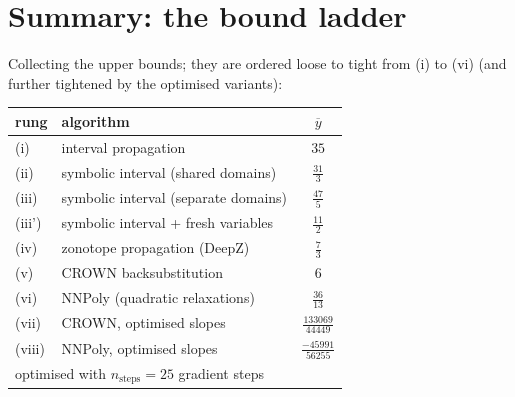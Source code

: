 \documentclass[11pt]{article}
\begin{document}
\section{Summary: the bound ladder}
Collecting the upper bounds; they are ordered loose to tight from (i) to (vi)
(and further tightened by the optimised variants):
\begin{table}[ht]\centering
\begin{tabular}{llc}\toprule
rung & algorithm & $\overline{y}$ \\
\midrule
(i) & interval propagation & $35$ \\
(ii) & symbolic interval (shared domains) & $\frac{31}{3}$ \\
(iii) & symbolic interval (separate domains) & $\frac{47}{5}$ \\
(iii') & symbolic interval + fresh variables & $\frac{11}{2}$ \\
(iv) & zonotope propagation (DeepZ) & $\frac{7}{3}$ \\
(v) & CROWN backsubstitution & $6$ \\
(vi) & NNPoly (quadratic relaxations) & $\frac{36}{13}$ \\
\midrule
(vii) & CROWN, optimised slopes & $\frac{133069}{44449}$ \\ 
(viii) & NNPoly, optimised slopes & $\frac{-45991}{56255}$ \\ 
\multicolumn{3}{l}{\footnotesize optimised with $n_{\text{steps}} = 25$ gradient steps} \\ 
\bottomrule
\end{tabular}
\end{table}
\end{document}
